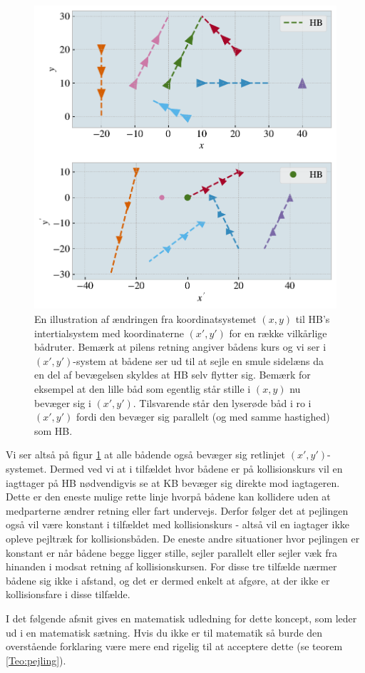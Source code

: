 \documentclass[%
 reprint,
nofootinbib,
aps,
]{revtex4-1}
\begin{document}
\begin{figure}[H]
  \includegraphics[width=\linewidth]{figures/reference_frame_explainer.pdf}
  \caption{En illustration af ændringen fra koordinatsystemet $(x,y)$ til HB's intertialsystem med koordinaterne  $(x',y')$ for en række vilkårlige bådruter. Bemærk at pilens retning angiver bådens kurs og vi ser i $(x',y')$-system at bådene ser ud til at sejle en smule sidelæns da en del af bevægelsen skyldes at HB selv flytter sig. Bemærk for eksempel at den lille båd som egentlig står stille i $(x,y)$ nu bevæger sig i  $(x',y')$. Tilsvarende står den lyserøde båd i ro i $(x',y')$ fordi den bevæger sig parallelt (og med samme hastighed) som HB. }
  \label{fig:reference_frame_explainer}
\end{figure}

Vi ser altså på figur \ref{fig:reference_frame_explainer} at alle bådende også bevæger sig retlinjet $(x',y')$-systemet. Dermed ved vi at i tilfældet hvor bådene er på kollisionskurs vil en iagttager på HB nødvendigvis se at KB bevæger sig direkte mod iagtageren. Dette er den eneste mulige rette linje hvorpå bådene kan kollidere uden at medparterne ændrer retning eller fart undervejs. Derfor følger det at pejlingen også vil være konstant i tilfældet med kollisionskurs - altså vil en iagtager ikke opleve pejltræk for kollisionsbåden. De eneste andre situationer hvor pejlingen er konstant er når bådene begge ligger stille, sejler parallelt eller sejler væk fra hinanden i modsat retning af kollisionskursen. For disse tre tilfælde nærmer bådene sig ikke i afstand, og det er dermed enkelt at afgøre, at der ikke er kollisionsfare i disse tilfælde. \par
I det følgende afsnit gives en matematisk udledning for dette koncept, som leder ud i en matematisk sætning. Hvis du ikke er til matematik så burde den overstående forklaring være mere end rigelig til at acceptere dette (se teorem \ref{Teo:pejling}).
\end{document}
